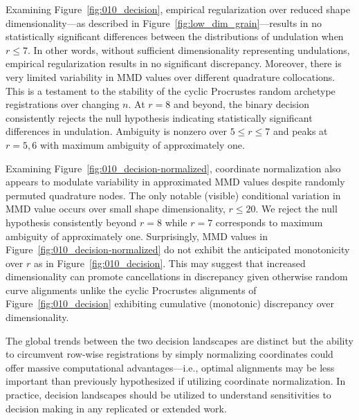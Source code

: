 \documentclass[pdflatex,iicol]{sn-jnl}%
\theoremstyle{thmstyleone}%
\theoremstyle{thmstyletwo}%
\theoremstyle{thmstylethree}%
\begin{document}
Examining Figure~\ref{fig:010_decision}, empirical regularization over reduced shape dimensionality---as described in Figure~\ref{fig:low_dim_grain}---results in no statistically significant differences between the distributions of undulation when $r \leq 7$. In other words, without sufficient dimensionality representing undulations, empirical regularization results in no significant discrepancy. Moreover, there is very limited variability in MMD values over different quadrature collocations. This is a testament to the stability of the cyclic Procrustes random archetype registrations over changing $n$. At $r=8$ and beyond, the binary decision consistently rejects the null hypothesis indicating statistically significant differences in undulation. Ambiguity is nonzero over $5\leq r\leq 7$ and peaks at $r=5,6$ with maximum ambiguity of approximately one.

Examining Figure~\ref{fig:010_decision-normalized}, coordinate normalization also appears to modulate variability in approximated MMD values despite randomly permuted quadrature nodes. The only notable (visible) conditional variation in MMD value occurs over small shape dimensionality, $r \leq 20$. We reject the null hypothesis consistently beyond $r = 8$ while $r=7$ corresponds to maximum ambiguity of approximately one. Surprisingly, MMD values in Figure~\ref{fig:010_decision-normalized} do not exhibit the anticipated monotonicity over $r$ as in Figure~\ref{fig:010_decision}. This may suggest that increased dimensionality can promote cancellations in discrepancy given otherwise random curve alignments unlike the cyclic Procrustes alignments of Figure~\ref{fig:010_decision} exhibiting cumulative (monotonic) discrepancy over dimensionality. 

The global trends between the two decision landscapes are distinct but the ability to circumvent row-wise registrations by simply normalizing coordinates could offer massive computational advantages---i.e., optimal alignments may be less important than previously hypothesized if utilizing coordinate normalization. In practice, decision landscapes should be utilized to understand sensitivities to decision making in any replicated or extended work.
\end{document}
